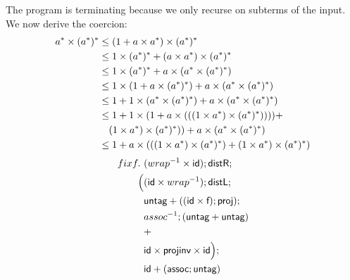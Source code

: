 \documentclass[a4paper,UKenglish,cleveref, autoref, thm-restate]{lipics-v2021}
\begin{document}
The program is terminating because we only recurse on subterms of the input. We now derive the coercion:
\begin{align}
a^* \times ({a^*})^* &\leq (1 + a \times a^*) \times ({a^*})^*   \\
                     &\leq 1 \times ({a^*})^* + (a \times a^* ) \times ({a^*})^*\\
                     &\leq 1 \times ({a^*})^* +  a \times (a^*  \times ({a^*})^*) \\
                     &\leq 1 \times (1 + a \times ({a^*})^*) +  a \times (a^*  \times ({a^*})^*) \\
                     &\leq 1 + 1 \times (a^* \times ({a^*})^*) +  a \times (a^*  \times ({a^*})^*)\\
                     &\leq 1 + 1\times ( 1 + a \times (((1 \times a^*) \times ({a^*})^*)))) +\\
                     &\quad(1 \times a^*) \times ({a^*})^*))  + a \times (a^*  \times ({a^*})^*) \\
                     &\leq 1 + a \times (((1 \times a^*) \times ({a^*})^*) + (1 \times a^*) \times ({a^*})^*)
\end{align}
\begin{align}
\fix f.~&(\dslcominv{wrap} \times \dslcom{id});\dslcom{distR};\\
 \Big( &(\dslcom{id} \times \dslcominv{wrap});\dslcom{distL};\\
       &\dslcom{untag} + ((\dslcom{id} \times \dslcom{f});\dslcom{proj});\\
       &\dslcominv{assoc};(\dslcom{untag} + \dslcom{untag}) \\
&+\\
 &\dslcom{id} \times \dslcom{projinv} \times \dslcom{id} \Big);\\
 &\dslcom{id} + (\dslcom{assoc} ; \dslcom{untag})
\end{align}
\end{document}
